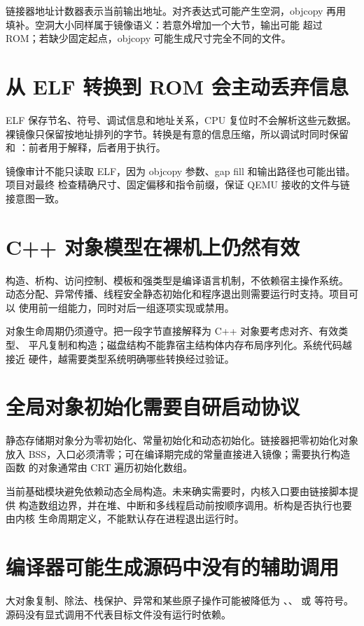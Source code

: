 链接器地址计数器表示当前输出地址。对齐表达式可能产生空洞，objcopy 再用
 填补。空洞大小同样属于镜像语义：若意外增加一个大节，输出可能
超过 ROM；若缺少固定起点，objcopy 可能生成尺寸完全不同的文件。

\section{从 ELF 转换到 ROM 会主动丢弃信息}

ELF 保存节名、符号、调试信息和地址关系，CPU 复位时不会解析这些元数据。
裸镜像只保留按地址排列的字节。转换是有意的信息压缩，所以调试时同时保留
 和 ：前者用于解释，后者用于执行。

镜像审计不能只读取 ELF，因为 objcopy 参数、gap fill 和输出路径也可能出错。
项目对最终  检查精确尺寸、固定偏移和指令前缀，保证
QEMU 接收的文件与链接意图一致。

\section{C++ 对象模型在裸机上仍然有效}

构造、析构、访问控制、模板和强类型是编译语言机制，不依赖宿主操作系统。
动态分配、异常传播、线程安全静态初始化和程序退出则需要运行时支持。项目可以
使用前一组能力，同时对后一组逐项实现或禁用。

对象生命周期仍须遵守。把一段字节直接解释为 C++ 对象要考虑对齐、有效类型、
平凡复制和构造；磁盘结构不能靠宿主结构体内存布局序列化。系统代码越接近
硬件，越需要类型系统明确哪些转换经过验证。

\section{全局对象初始化需要自研启动协议}

静态存储期对象分为零初始化、常量初始化和动态初始化。链接器把零初始化对象
放入 BSS，入口必须清零；可在编译期完成的常量直接进入镜像；需要执行构造函数
的对象通常由 CRT 遍历初始化数组。

当前基础模块避免依赖动态全局构造。未来确实需要时，内核入口要由链接脚本提供
构造数组边界，并在堆、中断和多线程启动前按顺序调用。析构是否执行也要由内核
生命周期定义，不能默认存在进程退出运行时。

\section{编译器可能生成源码中没有的辅助调用}

大对象复制、除法、栈保护、异常和某些原子操作可能被降低为
、、 或
 等符号。源码没有显式调用不代表目标文件没有运行时依赖。

